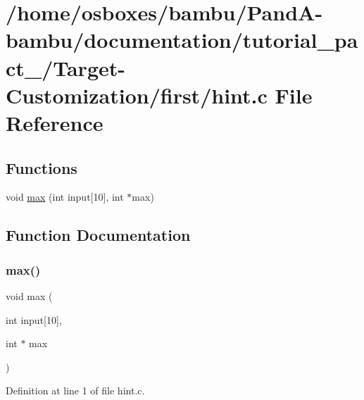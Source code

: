 \hypertarget{tutorial__pact__2019_2Target-Customization_2first_2hint_8c}{}\section{/home/osboxes/bambu/\+Pand\+A-\/bambu/documentation/tutorial\+\_\+pact\+\_/\+Target-\/\+Customization/first/hint.c File Reference}
\label{tutorial__pact__2019_2Target-Customization_2first_2hint_8c}
\subsection*{Functions}
\begin{DoxyCompactItemize}
\item 
void \hyperlink{tutorial__pact__2019_2Target-Customization_2first_2hint_8c_a28f422940797ea297699ba55d89171c5}{max} (int input\mbox{[}10\mbox{]}, int $\ast$max)
\end{DoxyCompactItemize}


\subsection{Function Documentation}
\mbox{\label{tutorial__pact__2019_2Target-Customization_2first_2hint_8c_a28f422940797ea297699ba55d89171c5}} 
\subsubsection{\texorpdfstring{max()}{max()}}
{\footnotesize\ttfamily void max (\begin{DoxyParamCaption}\item[{int}]{input\mbox{[}10\mbox{]},  }\item[{int $\ast$}]{max }\end{DoxyParamCaption})}



Definition at line 1 of file hint.\+c.

